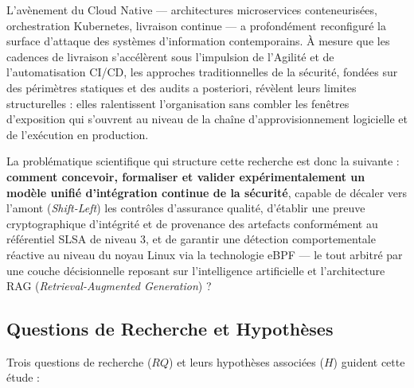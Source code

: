 L'avènement du Cloud Native — architectures microservices conteneurisées, orchestration Kubernetes, livraison continue — a profondément reconfiguré la surface d'attaque des systèmes d'information contemporains. À mesure que les cadences de livraison s'accélèrent sous l'impulsion de l'Agilité et de l'automatisation CI/CD, les approches traditionnelles de la sécurité, fondées sur des périmètres statiques et des audits a posteriori, révèlent leurs limites structurelles : elles ralentissent l'organisation sans combler les fenêtres d'exposition qui s'ouvrent au niveau de la chaîne d'approvisionnement logicielle et de l'exécution en production.

La problématique scientifique qui structure cette recherche est donc la suivante : \textbf{comment concevoir, formaliser et valider expérimentalement un modèle unifié d'intégration continue de la sécurité}, capable de décaler vers l'amont (\textit{Shift-Left}) les contrôles d'assurance qualité, d'établir une preuve cryptographique d'intégrité et de provenance des artefacts conformément au référentiel SLSA de niveau 3, et de garantir une détection comportementale réactive au niveau du noyau Linux via la technologie eBPF — le tout arbitré par une couche décisionnelle reposant sur l'intelligence artificielle et l'architecture RAG (\textit{Retrieval-Augmented Generation}) ?

\subsection{Questions de Recherche et Hypothèses}

Trois questions de recherche ($RQ$) et leurs hypothèses associées ($H$) guident cette étude :


